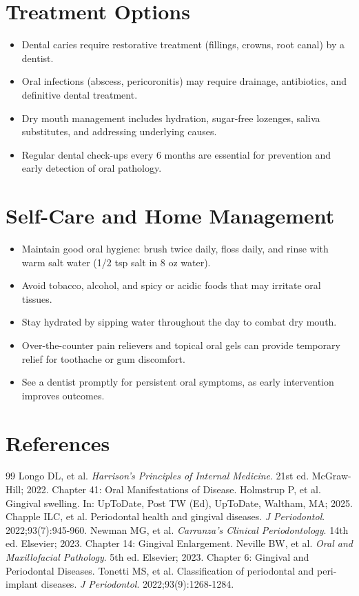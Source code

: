 \section*{Treatment Options}
\begin{itemize}
  \item Dental caries require restorative treatment (fillings, crowns, root canal) by a dentist.
  \item Oral infections (abscess, pericoronitis) may require drainage, antibiotics, and definitive dental treatment.
  \item Dry mouth management includes hydration, sugar-free lozenges, saliva substitutes, and addressing underlying causes.
  \item Regular dental check-ups every 6 months are essential for prevention and early detection of oral pathology.
\end{itemize}

\section*{Self-Care and Home Management}
\begin{itemize}
  \item Maintain good oral hygiene: brush twice daily, floss daily, and rinse with warm salt water (1/2 tsp salt in 8 oz water).
  \item Avoid tobacco, alcohol, and spicy or acidic foods that may irritate oral tissues.
  \item Stay hydrated by sipping water throughout the day to combat dry mouth.
  \item Over-the-counter pain relievers and topical oral gels can provide temporary relief for toothache or gum discomfort.
  \item See a dentist promptly for persistent oral symptoms, as early intervention improves outcomes.
\end{itemize}

\section*{References}

\begin{thebibliography}{99}
 Longo DL, et al. \emph{Harrison's Principles of Internal Medicine}. 21st ed. McGraw-Hill; 2022. Chapter 41: Oral Manifestations of Disease.
 Holmstrup P, et al. Gingival swelling. In: UpToDate, Post TW (Ed), UpToDate, Waltham, MA; 2025.
 Chapple ILC, et al. Periodontal health and gingival diseases. \emph{J Periodontol}. 2022;93(7):945-960.
 Newman MG, et al. \emph{Carranza's Clinical Periodontology}. 14th ed. Elsevier; 2023. Chapter 14: Gingival Enlargement.
 Neville BW, et al. \emph{Oral and Maxillofacial Pathology}. 5th ed. Elsevier; 2023. Chapter 6: Gingival and Periodontal Diseases.
 Tonetti MS, et al. Classification of periodontal and peri-implant diseases. \emph{J Periodontol}. 2022;93(9):1268-1284.
\end{thebibliography}

